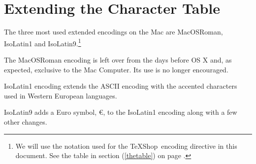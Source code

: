 \documentclass[letterpaper,11pt]{article}
\newcommand{\TS}{\textsf{\TeX Shop}}
\newcommand{\acr}[1]{\textsf{#1}}
\begin{document}
%
%
%

\section{Extending the Character Table}


The three most used extended encodings on the Mac are \acr{MacOSRoman}, \acr{IsoLatin1} and \acr{IsoLatin9}.\footnote{We will use the notation used for the \TS\ encoding directive in this document. See the table in section (\ref{thetable}) on page \pageref{thetable}.}

The \acr{MacOSRoman} encoding is left over from the days before \acr{OS X} and, as expected, exclusive to the Mac Computer. Its use is no longer encouraged.

\acr{IsoLatin1} encoding extends the \acr{ASCII} encoding with the accented characters used in Western European languages.

\acr{IsoLatin9} adds a Euro symbol, €, to the \acr{IsoLatin1} encoding along with a few other changes.
\end{document}
